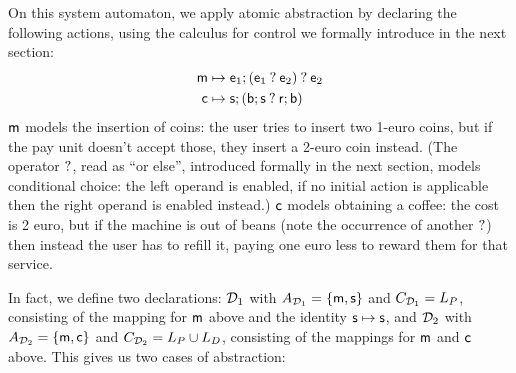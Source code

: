 On this system automaton, we apply atomic abstraction by declaring the following actions, using the calculus for control we formally introduce in the next section:
%
\begin{align*}
\mathsf{m} & \mapsto \mathsf{e}_1;(\mathsf{e}_1\mathbin{?} \mathsf{e}_2) \mathbin{?} \mathsf{e}_2 \\
\mathsf{c} & \mapsto \mathsf{s};(\mathsf{b};\mathsf{s} \mathbin{?} \mathsf{r};\mathsf{b}) 
\end{align*}
%
$\mathsf{m}$ models the insertion of coins: the user tries to insert two 1-euro coins, but if the pay unit doesn't accept those, they insert a 2-euro coin instead. (The operator $\mathbin{?}$, read as ``or else'', introduced formally in the next section, models conditional choice: the left operand is enabled, if no initial action is applicable then the right operand is enabled instead.) $\mathsf{c}$ models obtaining a coffee: the cost is 2 euro, but if the machine is out of beans (note the occurrence of another $\mathbin{?}$) then instead the user has to refill it, paying one euro less to reward them for that service.

In fact, we define two declarations: $\mathcal{D}_1$ with $A_{\mathcal{D}_1}=\{{\mathsf{m},\mathsf{s}}\}$ and $C_{\mathcal{D}_1}= L_P$, consisting of the mapping for $\mathsf{m}$ above and the identity $\mathsf{s}\mapsto \mathsf{s}$, and $\mathcal{D}_2$ with $A_{\mathcal{D}_2}=\{{\mathsf{m},\mathsf{c}}\}$ and $C_{\mathcal{D}_2}=L_P\cup L_D$, consisting of the mappings for $\mathsf{m}$ and $\mathsf{c}$ above. This gives us two cases of abstraction:

